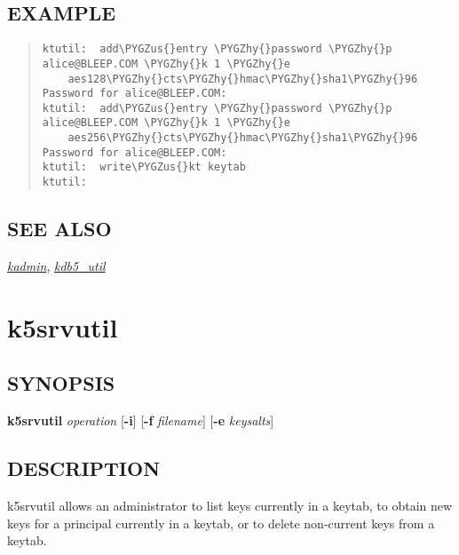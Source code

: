 \documentclass[letterpaper,10pt,english]{sphinxmanual}
\def\PYGZus{\char`\_}
\def\PYGZhy{\char`\-}
\begin{document}
\subsection{EXAMPLE}
\label{admin/admin_commands/ktutil:example}\begin{quote}

\begin{Verbatim}[commandchars=\\\{\}]
ktutil:  add\PYGZus{}entry \PYGZhy{}password \PYGZhy{}p alice@BLEEP.COM \PYGZhy{}k 1 \PYGZhy{}e
    aes128\PYGZhy{}cts\PYGZhy{}hmac\PYGZhy{}sha1\PYGZhy{}96
Password for alice@BLEEP.COM:
ktutil:  add\PYGZus{}entry \PYGZhy{}password \PYGZhy{}p alice@BLEEP.COM \PYGZhy{}k 1 \PYGZhy{}e
    aes256\PYGZhy{}cts\PYGZhy{}hmac\PYGZhy{}sha1\PYGZhy{}96
Password for alice@BLEEP.COM:
ktutil:  write\PYGZus{}kt keytab
ktutil:
\end{Verbatim}
\end{quote}


\subsection{SEE ALSO}
\label{admin/admin_commands/ktutil:see-also}
{\hyperref[admin/admin_commands/kadmin_local:kadmin-1]{\emph{kadmin}}}, {\hyperref[admin/admin_commands/kdb5_util:kdb5-util-8]{\emph{kdb5\_util}}}


\section{k5srvutil}
\label{admin/admin_commands/k5srvutil:k5srvutil-1}\label{admin/admin_commands/k5srvutil::doc}\label{admin/admin_commands/k5srvutil:k5srvutil}

\subsection{SYNOPSIS}
\label{admin/admin_commands/k5srvutil:synopsis}
\textbf{k5srvutil} \emph{operation}
{[}\textbf{-i}{]}
{[}\textbf{-f} \emph{filename}{]}
{[}\textbf{-e} \emph{keysalts}{]}


\subsection{DESCRIPTION}
\label{admin/admin_commands/k5srvutil:description}
k5srvutil allows an administrator to list keys currently in
a keytab, to obtain new keys for a principal currently in a keytab,
or to delete non-current keys from a keytab.
\end{document}
